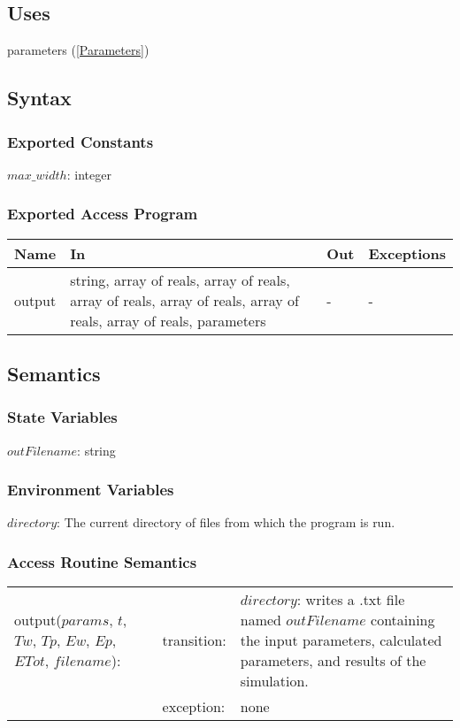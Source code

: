 \documentclass[12pt]{article}
\begin{document}
\subsection{Uses}
parameters (\ref{Parameters})
\subsection{Syntax}
\subsubsection{Exported Constants}
$max\_width$: integer
\subsubsection{Exported Access Program}
\begin{center}
\begin{tabular}{p{3cm} p{7cm} p{2cm} p{2cm}}
\hline
\textbf{Name} & \textbf{In} & \textbf{Out} & \textbf{Exceptions} \\
\hline
output & string, array of reals, array of reals, array of reals, array of reals, array of reals, array of reals, parameters & - & - \\
\hline
\end{tabular}
\end{center}
\subsection{Semantics}
\subsubsection{State Variables}
$outFilename$: string
\subsubsection{Environment Variables}
$directory$: The current directory of files from which the program is run.
\subsubsection{Access Routine Semantics}
\begin{center}
\begin{tabular}{l l p{4cm}}
output($params$, $t$, $Tw$, $Tp$, $Ew$, $Ep$, $ETot$, $filename$): & transition: & $directory$: writes a .txt file named $outFilename$ containing the input parameters, calculated parameters, and results of the simulation. \\
& exception: & none \\
\end{tabular}
\end{center}
\end{document}
